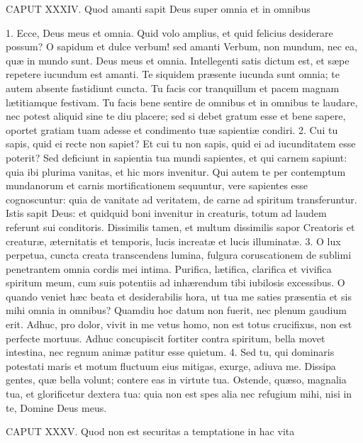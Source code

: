 CAPUT XXXIV.
Quod amanti sapit Deus super omnia et in omnibus

1. Ecce, Deus meus et omnia. Quid volo amplius, et quid felicius desiderare possum? O sapidum et dulce verbum! sed amanti Verbum, non mundum, nec ea, quæ in mundo sunt. Deus meus et omnia. Intellegenti satis dictum est, et sæpe repetere iucundum est amanti. Te siquidem præsente iucunda sunt omnia; te autem absente fastidiunt cuncta. Tu facis cor tranquillum et pacem magnam lætitiamque festivam. Tu facis bene sentire de omnibus et in omnibus te laudare, nec potest aliquid sine te diu placere; sed si debet gratum esse et bene sapere, oportet gratiam tuam adesse et condimento tuæ sapientiæ condiri.
2. Cui tu sapis, quid ei recte non sapiet? Et cui tu non sapis, quid ei ad iucunditatem esse poterit? Sed deficiunt in sapientia tua mundi sapientes, et qui carnem sapiunt: quia ibi plurima vanitas, et hic mors invenitur. Qui autem te per contemptum mundanorum et carnis mortificationem sequuntur, vere sapientes esse cognoscuntur: quia de vanitate ad veritatem, de carne ad spiritum transferuntur. Istis sapit Deus: et quidquid boni invenitur in creaturis, totum ad laudem referunt sui conditoris. Dissimilis tamen, et multum dissimilis sapor Creatoris et creaturæ, æternitatis et temporis, lucis increatæ et lucis illuminatæ.
3. O lux perpetua, cuncta creata transcendens lumina, fulgura coruscationem de sublimi penetrantem omnia cordis mei intima. Purifica, lætifica, clarifica et vivifica spiritum meum, cum suis potentiis ad inhærendum tibi iubilosis excessibus. O quando veniet hæc beata et desiderabilis hora, ut tua me saties præsentia et sis mihi omnia in omnibus? Quamdiu hoc datum non fuerit, nec plenum gaudium erit. Adhuc, pro dolor, vivit in me vetus homo, non est totus crucifixus, non est perfecte mortuus. Adhuc concupiscit fortiter contra spiritum, bella movet intestina, nec regnum animæ patitur esse quietum.
4. Sed tu, qui dominaris potestati maris et motum fluctuum eius mitigas, exurge, adiuva me. Dissipa gentes, quæ bella volunt; contere eas in virtute tua. Ostende, quæso, magnalia tua, et glorificetur dextera tua: quia non est spes alia nec refugium mihi, nisi in te, Domine Deus meus.


CAPUT XXXV.
Quod non est securitas a temptatione in hac vita

